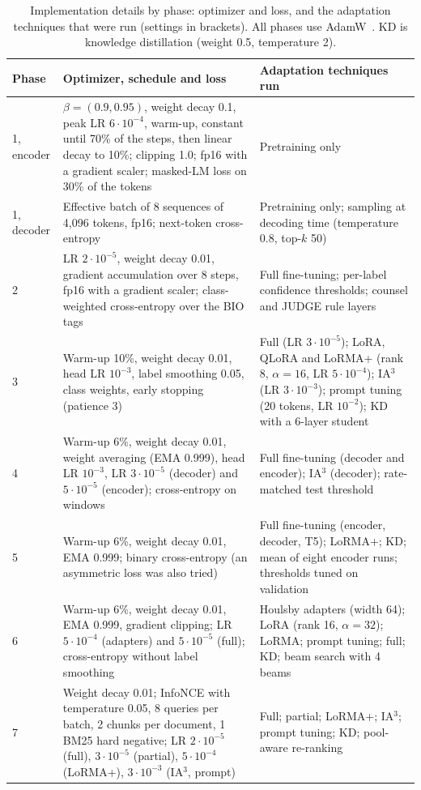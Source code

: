 \documentclass[10pt,a4paper]{article}
\begin{document}
\begin{table}[h]\centering\scriptsize
\caption{Implementation details by phase: optimizer and loss, and the adaptation techniques that were run (settings in brackets). All phases use AdamW~\cite{adamw}. KD is knowledge distillation (weight 0.5, temperature 2).}\label{tab:impl}
\begin{tabular}{@{}lp{7.0cm}p{7.7cm}@{}}
\toprule
Phase & Optimizer, schedule and loss & Adaptation techniques run\\\midrule
1, encoder & $\beta=(0.9,0.95)$, weight decay 0.1, peak LR $6\cdot10^{-4}$, warm-up, constant until 70\% of the steps, then linear decay to 10\%; clipping 1.0; fp16 with a gradient scaler; masked-LM loss on 30\% of the tokens & Pretraining only\\
1, decoder & Effective batch of 8 sequences of 4{,}096 tokens, fp16; next-token cross-entropy & Pretraining only; sampling at decoding time (temperature 0.8, top-$k$ 50)\\
2 & LR $2\cdot10^{-5}$, weight decay 0.01, gradient accumulation over 8 steps, fp16 with a gradient scaler; class-weighted cross-entropy over the BIO tags & Full fine-tuning; per-label confidence thresholds; counsel and JUDGE rule layers\\
3 & Warm-up 10\%, weight decay 0.01, head LR $10^{-3}$, label smoothing 0.05, class weights, early stopping (patience 3) & Full (LR $3\cdot10^{-5}$); LoRA, QLoRA and LoRMA+ (rank 8, $\alpha=16$, LR $5\cdot10^{-4}$); IA$^3$ (LR $3\cdot10^{-3}$); prompt tuning (20 tokens, LR $10^{-2}$); KD with a 6-layer student\\
4 & Warm-up 6\%, weight decay 0.01, weight averaging (EMA 0.999), head LR $10^{-3}$, LR $3\cdot10^{-5}$ (decoder) and $5\cdot10^{-5}$ (encoder); cross-entropy on windows & Full fine-tuning (decoder and encoder); IA$^3$ (decoder); rate-matched test threshold\\
5 & Warm-up 6\%, weight decay 0.01, EMA 0.999; binary cross-entropy (an asymmetric loss was also tried) & Full fine-tuning (encoder, decoder, T5); LoRMA+; KD; mean of eight encoder runs; thresholds tuned on validation\\
6 & Warm-up 6\%, weight decay 0.01, EMA 0.999, gradient clipping; LR $5\cdot10^{-4}$ (adapters) and $5\cdot10^{-5}$ (full); cross-entropy without label smoothing & Houlsby adapters (width 64); LoRA (rank 16, $\alpha=32$); LoRMA; prompt tuning; full; KD; beam search with 4 beams\\
7 & Weight decay 0.01; InfoNCE with temperature 0.05, 8 queries per batch, 2 chunks per document, 1 BM25 hard negative; LR $2\cdot10^{-5}$ (full), $3\cdot10^{-5}$ (partial), $5\cdot10^{-4}$ (LoRMA+), $3\cdot10^{-3}$ (IA$^3$, prompt) & Full; partial; LoRMA+; IA$^3$; prompt tuning; KD; pool-aware re-ranking\\\bottomrule
\end{tabular}
\end{table}
\end{document}
